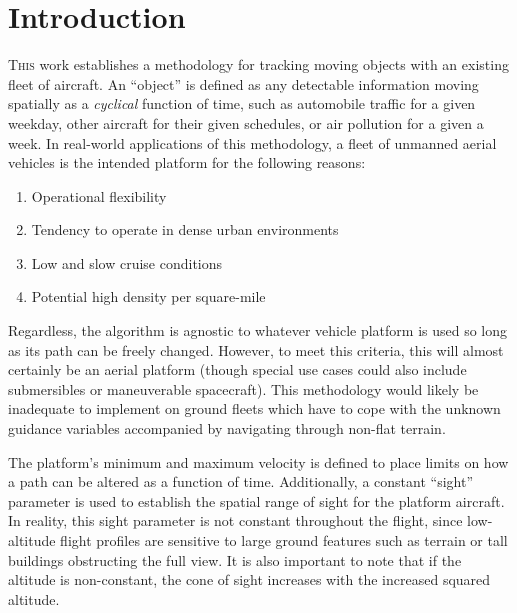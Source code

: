 \documentclass[conf]{new-aiaa}
\begin{document}
\section{Introduction}
\lettrine{T}{his} work establishes a methodology for tracking moving objects with an existing fleet of aircraft. An ``object'' is defined as any detectable information moving spatially as a \emph{cyclical} function of time, such as automobile traffic for a given weekday, other aircraft for their given schedules, or air pollution for a given a week. In real-world applications of this methodology, a fleet of unmanned aerial vehicles is the intended platform for the following reasons:
\begin{enumerate}
\item Operational flexibility
\item Tendency to operate in dense urban environments
\item Low and slow cruise conditions
\item Potential high density per square-mile
\end{enumerate}

Regardless, the algorithm is agnostic to whatever vehicle platform is used so long as its path can be freely changed. However, to meet this criteria, this will almost certainly be an aerial platform (though special use cases could also include submersibles or maneuverable spacecraft). This methodology would likely be inadequate to implement on ground fleets which have to cope with the unknown guidance variables accompanied by navigating through non-flat terrain.

The platform's minimum and maximum velocity is defined to place limits on how a path can be altered as a function of time. Additionally, a constant ``sight'' parameter is used to establish the spatial range of sight for the platform aircraft. In reality, this sight parameter is not constant throughout the flight, since low-altitude flight profiles are sensitive to large ground features such as terrain or tall buildings obstructing the full view. It is also important to note that if the altitude is non-constant, the cone of sight increases with the increased squared altitude.\cite{zorbas2013energyefficientmobiletracking}





\end{document}
